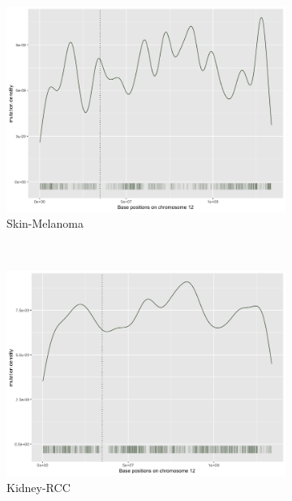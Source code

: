 \begin{figure}
    \begin{subfigure}{.5\textwidth}
    
    \includegraphics[width=\linewidth,height=0.7\textwidth]{graphics/mutdistribution_melanoma.png}
    \caption{Skin-Melanoma}
    \label{fig:density_skin}
    \end{subfigure}
    ~
    \begin{subfigure}{.5\textwidth}
    
    \includegraphics[width=\linewidth,height=0.7\textwidth]{graphics/mutdistribution_kidney.png}
    \caption{Kidney-RCC}
    \label{fig:density_kidney}
    \end{subfigure} \\
    
    \begin{subfigure}{.5\textwidth}
    

\end{subfigure}
\end{figure}
